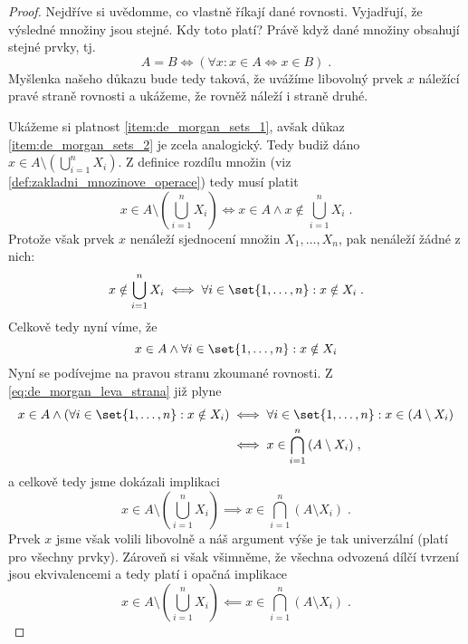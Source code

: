 \begin{proof}
    Nejdříve si uvědomme, co vlastně říkají dané rovnosti. Vyjadřují, že výsledné množiny jsou stejné. Kdy toto platí? Právě když dané množiny obsahují stejné prvky, tj.
    \begin{equation*}
        A=B \iff \left(\forall x : x\in A \iff x\in B\right)\; .     
    \end{equation*}
    Myšlenka našeho důkazu bude tedy taková, že uvážíme libovolný prvek $x$ náležící pravé straně rovnosti a ukážeme, že rovněž náleží i straně druhé.\par
    Ukážeme si platnost \ref{item:de_morgan_sets_1}, avšak důkaz \ref{item:de_morgan_sets_2} je zcela analogický. Tedy budiž dáno $x\in A \setminus \left(\bigcup_{i=1}^{n}{X_i}\right)$. Z definice rozdílu množin (viz \ref{def:zakladni_mnozinove_operace}) tedy musí platit
    \begin{equation*}
        x \in A \setminus \left(\bigcup\limits_{i=1}^{n}{X_i}\right) \iff x\in A \land x\notin \bigcup\limits_{i=1}^{n}{X_i}\; .
    \end{equation*}
    Protože však prvek $x$ nenáleží sjednocení množin $X_1,\ldots,X_n$, pak nenáleží žádné z nich:
    \begin{equation*}
        x\notin \bigcup\limits_{i=1}^{n}{X_i} \iff \forall i\in\set{1,\ldots,n} : x\notin X_i\; .
    \end{equation*}
    Celkově tedy nyní víme, že
    \begin{equation}\label{eq:de_morgan_leva_strana}
        x\in A \land \forall i\in\set{1,\ldots,n} : x\notin X_i
    \end{equation}
    Nyní se podívejme na pravou stranu zkoumané rovnosti. Z \eqref{eq:de_morgan_leva_strana} již plyne
    \begin{align*}
        x\in A \land \left(\forall i\in\set{1,\ldots,n} : x\notin X_i\right) &\iff \forall i\in\set{1,\ldots,n} : x\in (A \setminus X_i)\\
        &\iff x\in\bigcap\limits_{i=1}^{n}{(A \setminus X_i)}\; ,
    \end{align*}
    a celkově tedy jsme dokázali implikaci
    \begin{equation*}
        x \in A \setminus \left(\bigcup\limits_{i=1}^{n}{X_i}\right) \implies x\in\bigcap\limits_{i=1}^{n}{(A \setminus X_i)}\; .
    \end{equation*}
    Prvek $x$ jsme však volili libovolně a náš argument výše je tak univerzální (platí pro všechny prvky). Zároveň si však všimněme, že všechna odvozená dílčí tvrzení jsou ekvivalencemi a tedy platí i opačná implikace
    \begin{equation*}
        x \in A \setminus \left(\bigcup\limits_{i=1}^{n}{X_i}\right) \impliedby x\in\bigcap\limits_{i=1}^{n}{(A \setminus X_i)}\; .
    \end{equation*}


\end{proof}
